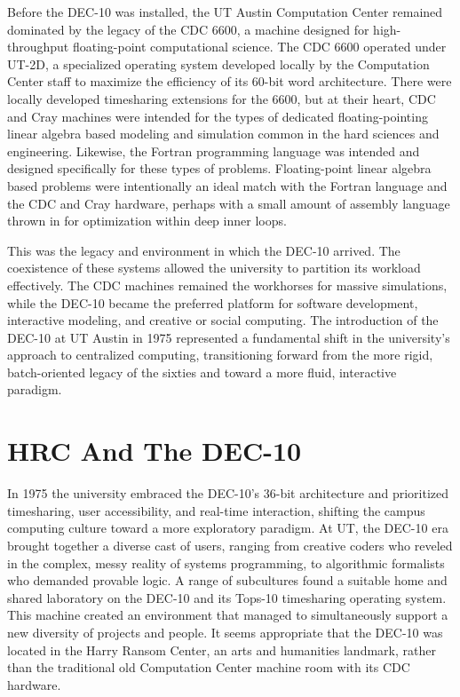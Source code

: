 Before the DEC-10 was installed, the UT Austin Computation Center remained dominated by the legacy of the CDC 6600, a machine designed for high-throughput floating-point computational science. The CDC 6600 operated under UT-2D, a specialized operating system developed locally by the Computation Center staff to maximize the efficiency of its 60-bit word architecture. There were locally developed timesharing extensions for the 6600, but at their heart, CDC and Cray machines were intended for the types of dedicated floating-pointing linear algebra based modeling and simulation common in the hard sciences and engineering. Likewise, the Fortran programming language was intended and designed specifically for these types of problems. Floating-point linear algebra based problems were intentionally an ideal match with the Fortran language and the CDC and Cray hardware, perhaps with a small amount of assembly language thrown in for optimization within deep inner loops. 

This was the legacy and environment in which the DEC-10 arrived. The coexistence of these systems allowed the university to partition its workload effectively. The CDC machines remained the workhorses for massive simulations, while the DEC-10 became the preferred platform for software development, interactive modeling, and creative or social computing. The introduction of the DEC-10 at UT Austin in 1975 represented a fundamental shift in the university's approach to centralized computing, transitioning forward from the more rigid, batch-oriented legacy of the sixties and toward a more fluid, interactive paradigm. 

\section{HRC And The DEC-10}

In 1975 the university embraced the DEC-10's 36-bit architecture and prioritized timesharing, user accessibility, and real-time interaction, shifting the campus computing culture toward a more exploratory paradigm. At UT, the DEC-10 era brought together a diverse cast of users, ranging from creative coders who reveled in the complex, messy reality of systems programming, to algorithmic formalists who demanded provable logic. A range of subcultures found a suitable home and shared laboratory on the DEC-10 and its Tops-10 timesharing operating system. This machine created an environment that managed to simultaneously support a new diversity of projects and people. It seems appropriate that the DEC-10 was located in the Harry Ransom Center, an arts and humanities landmark, rather than the traditional old Computation Center machine room with its CDC hardware.

